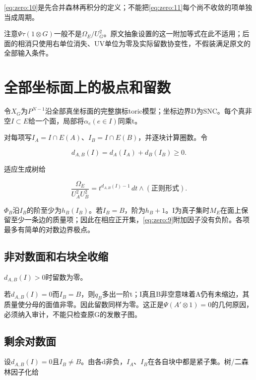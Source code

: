 \documentclass[11pt,a4paper,oneside]{ctexrep}
\theoremstyle{cnplain}
\theoremstyle{definition}
\theoremstyle{remark}
\begin{document}
\eqref{eq:zero:10}是先合并森林再积分的定义；不能把\eqref{eq:zero:11}每个尚不收敛的项单独当成周期。

注意\(\Psi \tau (1\otimes G)\)一般不是\(\Omega _E/U_G^{2}\)。原文抽象设置的这一附加等式在此不适用；后面的相消只使用右单位消失、UV单位为零及实际留数协变性，不假装满足原文的全部输入条件。

\section{全部坐标面上的极点和留数}\label{sec:zero:5}

令\(X_G\)为\(P^{N- 1}\)沿全部真坐标面的完整旗标toric模型；坐标边界D为SNC。每个真非空\(I\subset E\)给一个面，局部将\(\alpha _e(e\in I)\)同乘t。

对每项写\(I_A=I\cap E(A)\)、\(I_B=I\cap E(B)\)，并逐块计算圈数。令

\begin{equation}
d_{A,B}(I)=d_A(I_A)+d_B(I_B)\geq0.
\end{equation}

适应生成树给

\begin{equation}
\frac{\Omega_E}{U_A^2U_B^2}
       =t^{d_{A,B}(I)-1}\,dt\wedge(\text{正则形式}).            \label{eq:zero:12}
\end{equation}

\(\Phi _B\)沿\(I_B\)的阶至少为\(h_B(I_B)\)。若\(I_B=B\)，阶为\(h_B+1\)。I为真子集时\(M_E\)在面上保留至少一条边的质量项；因此在相应正开集，\eqref{eq:zero:9}附加因子没有负阶。各项最多有简单的对数边界极点。

\subsection{非对数面和右块全收缩}\label{sec:zero:5.1}

\(d_{A,B}(I)>0\)时留数为零。

若\(d_{A,B}(I)=0\)而\(I_B=B\)，则\(q_B\)多出一阶t；I真且B非空意味着A仍有未缩边，其质量使分母的面值非零。因此留数同样为零。这正是\(\Psi (A'\otimes 1)=0\)的几何原因，必须纳入审计，不能只检查原G的发散子图。

\subsection{剩余对数面}\label{sec:zero:5.2}

设\(d_{A,B}(I)=0\)且\(I_B\ne B\)。由各d非负，\(I_A\)、\(I_B\)在各自块中都是紧子集。树/二森林因子化给
\end{document}
